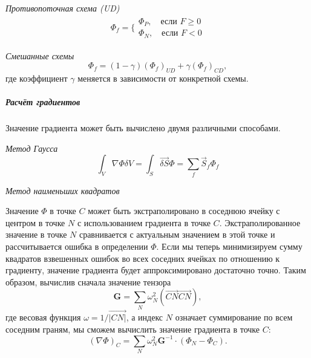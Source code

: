 		\textit{Противопоточная схема (UD)}
		\begin{equation}
			\begin{aligned}
				\Phi_f = \Bigg\{	\begin{array}{l}
					\Phi_P, \quad \text{если } F \geq 0 \\
					\Phi_N, \quad \text{если } F < 0
				\end{array}
			\end{aligned}
		\end{equation}
		
		\textit{Смешанные схемы}
		\begin{equation}
			\Phi_f = \left(1-\gamma\right)(\Phi_f)_{UD} + \gamma (\Phi_f)_{CD},
		\end{equation}
		где коэффициент $\gamma$ меняется в зависимости от конкретной схемы.
		
		\subparagraph{Расчёт градиентов\\}
		
		    Значение градиента может быть вычислено двумя различными способами.
			
			\textit{Метод Гаусса}
			\begin{equation}
				\int_V \nabla \Phi \delta V = \int_S \vec{\delta S} \Phi = \sum_f \vec{S}_f \Phi_f
			\end{equation}
			
			\textit{Метод наименьших квадратов}
			
			Значение $\Phi$ в точке $C$ может быть экстраполировано в соседнюю ячейку с центром в точке $N$ с использованием градиента в точке $C$. Экстраполированное значение в точке $N$ сравнивается с актуальным значением в этой точке и рассчитывается ошибка в определении $\Phi$. Если мы теперь минимизируем сумму квадратов взвешенных ошибок во всех соседних ячейках по отношению к градиенту, значение градиента будет аппроксимировано достаточно точно. Таким образом, вычислив сначала значение тензора
			\begin{equation}
				\mathbf{G} = \sum_N \omega_N^2 (\vec{CN}\vec{CN}),
			\end{equation}
			где весовая функция $\omega = 1/\vec{|CN|}$, а индекс $N$ означает суммирование по всем соседним граням, мы сможем вычислить значение градиента в точке $C$:
			\begin{equation}
				(\nabla \Phi)_C = \sum_N \omega_N^2 \mathbf{G}^{-1} \cdot  (\Phi_N - \Phi_C).
			\end{equation}
